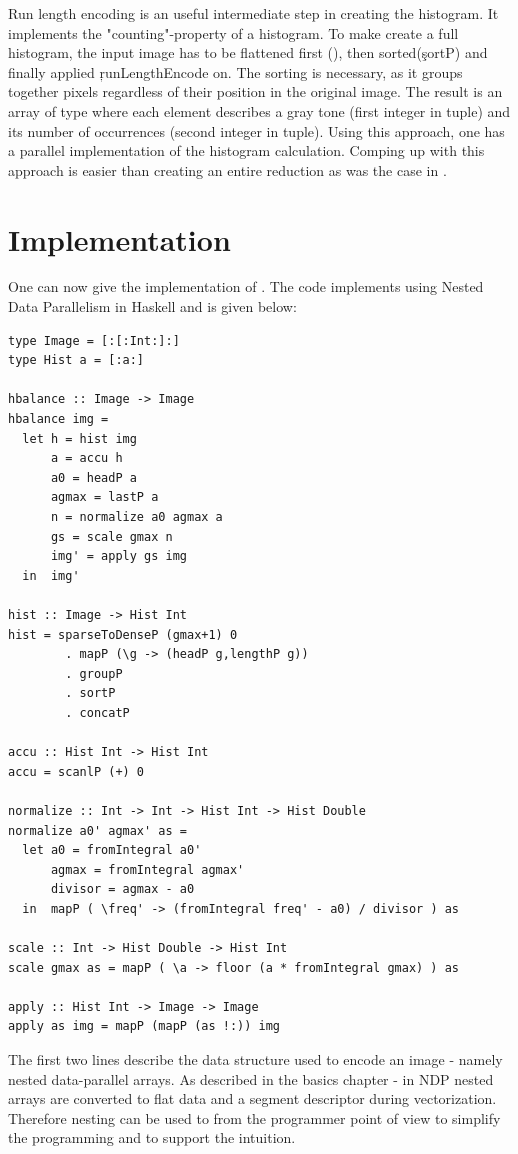     Run length encoding is an useful intermediate step in
    creating the histogram. It implements the "counting"-property
    of a histogram.
    To make create a full histogram, the input image has to be flattened first (),
    then sorted(\c{sortP}) and finally applied \c{runLengthEncode} on.
    The sorting is necessary, as it groups together pixels regardless of their
    position in the original image.
    The result is an array of type  where each element
    describes a gray tone (first integer in tuple) and its number of
    occurrences (second integer in tuple).
    Using this approach, one has a parallel implementation of the histogram calculation.
    Comping up with this approach is easier than creating an entire
    reduction as was the case in \man.
    
\section{Implementation}
  One can now give the implementation of \ndpn. The code
  implements \algo using Nested Data Parallelism in Haskell
  and is given below:
  \begin{lstlisting}
type Image = [:[:Int:]:]
type Hist a = [:a:]

hbalance :: Image -> Image
hbalance img =
  let h = hist img
      a = accu h
      a0 = headP a
      agmax = lastP a
      n = normalize a0 agmax a
      gs = scale gmax n
      img' = apply gs img
  in  img'

hist :: Image -> Hist Int
hist = sparseToDenseP (gmax+1) 0
        . mapP (\g -> (headP g,lengthP g))
        . groupP
        . sortP
        . concatP

accu :: Hist Int -> Hist Int
accu = scanlP (+) 0

normalize :: Int -> Int -> Hist Int -> Hist Double
normalize a0' agmax' as =
  let a0 = fromIntegral a0'
      agmax = fromIntegral agmax'
      divisor = agmax - a0
  in  mapP ( \freq' -> (fromIntegral freq' - a0) / divisor ) as

scale :: Int -> Hist Double -> Hist Int
scale gmax as = mapP ( \a -> floor (a * fromIntegral gmax) ) as

apply :: Hist Int -> Image -> Image
apply as img = mapP (mapP (as !:)) img
  \end{lstlisting}
  The first two lines describe the data structure used to encode an image - 
  namely nested data-parallel arrays.
  As described in the basics chapter - in NDP
  nested arrays are converted to flat data and a segment descriptor
  during vectorization. Therefore nesting
  can be used to from the programmer point of view to simplify
  the programming and to support the intuition.
  
